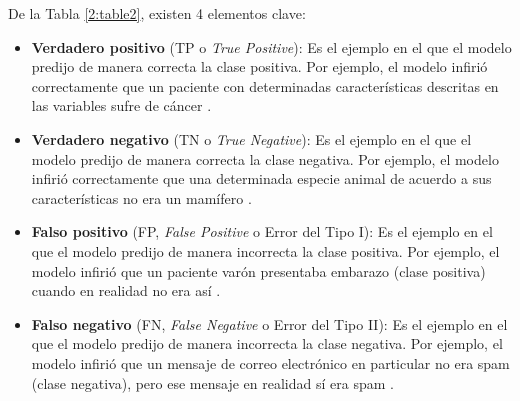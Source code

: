De la Tabla \ref{2:table2}, existen 4 elementos clave:
\begin{itemize}
	\item \textbf{Verdadero positivo} (TP o \textit{True Positive}): Es el ejemplo en el que el modelo predijo de manera correcta la clase positiva. Por ejemplo, el modelo infirió correctamente que un paciente con determinadas características descritas en las variables sufre de cáncer \parencite{gl_google2018machinelearning}.
	\item \textbf{Verdadero negativo} (TN o \textit{True Negative}): Es el ejemplo en el que el modelo predijo de manera correcta la clase negativa. Por ejemplo, el modelo infirió correctamente que una determinada especie animal de acuerdo a sus características no era un mamífero \parencite{gl_google2018machinelearning}.
	\item \textbf{Falso positivo} (FP, \textit{False Positive} o Error del Tipo I): Es el ejemplo en el que el modelo predijo de manera incorrecta la clase positiva. Por ejemplo, el modelo infirió que un paciente varón presentaba embarazo (clase positiva) cuando en realidad no era así \parencite{gl_google2018machinelearning}.
	\item \textbf{Falso negativo} (FN, \textit{False Negative} o Error del Tipo II): Es el ejemplo en el que el modelo predijo de manera incorrecta la clase negativa. Por ejemplo, el modelo infirió que un mensaje de correo electrónico en particular no era spam (clase negativa), pero ese mensaje en realidad sí era spam \parencite{gl_google2018machinelearning}. 
\end{itemize}

